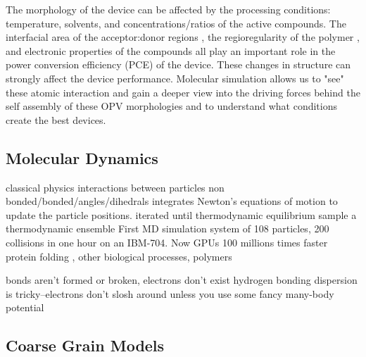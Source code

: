 The morphology of the device can be affected by the processing conditions: temperature, solvents, and concentrations/ratios of the active compounds. \cite{Ma2005,Hoppe2004a,Li2007}
The interfacial area of the acceptor:donor regions \cite{Mazzio2015}, the regioregularity of the polymer \cite{Kim2006}, and electronic properties of the compounds \cite{Scharber2006a} all play an important role in the power conversion efficiency (PCE) of the device. 
These changes in structure can strongly affect the device performance.
Molecular simulation allows us to "see" these atomic interaction and gain a deeper view into the driving forces behind the self assembly of these OPV morphologies and to understand what conditions create the best devices.

\subsection*{Molecular Dynamics}
classical physics
interactions between particles
non bonded/bonded/angles/dihedrals
integrates Newton's equations of motion to update the particle positions.
iterated until thermodynamic equilibrium
sample a thermodynamic ensemble
First MD simulation \cite{Alder1957} system of 108 particles, 200 collisions in one hour on an IBM-704.
Now GPUs 100 millions times faster
protein folding \cite{levitt75}, other biological processes, polymers \cite{Gartner2019a}


bonds aren't formed or broken, electrons don't exist
hydrogen bonding
dispersion is tricky--electrons don't slosh around unless you use some fancy many-body potential

\subsection*{Coarse Grain Models}

